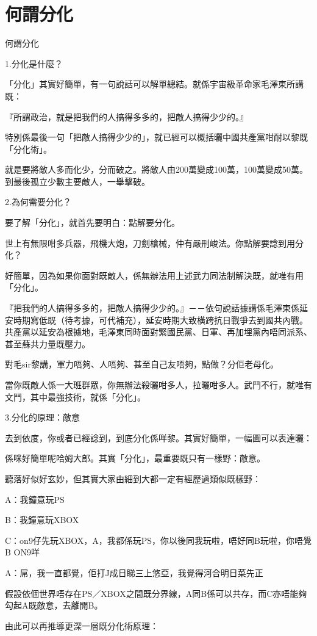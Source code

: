 \chapter{何謂分化}

何謂分化

1.分化是什麼？

「分化」其實好簡單，有一句說話可以解單總結。就係宇宙級革命家毛澤東所講既：

『所謂政治，就是把我們的人搞得多多的，把敵人搞得少少的。』

特別係最後一句「把敵人搞得少少的」，就已經可以概括曬中國共產黨咁耐以黎既「分化術」。

就是要將敵人多而化少，分而破之。將敵人由200萬變成100萬，100萬變成50萬。到最後孤立少數主要敵人，一舉擊破。

2.為何需要分化？

要了解「分化」，就首先要明白：點解要分化。

世上有無限咁多兵器，飛機大炮，刀劍槍械，仲有嚴刑峻法。你點解要諗到用分化？

好簡單，因為如果你面對既敵人，係無辦法用上述武力同法制解決既，就唯有用「分化」。

『把我們的人搞得多多的，把敵人搞得少少的。』－－依句說話據講係毛澤東係延安時期寫低既（待考據，可代補充），延安時期大致橫跨抗日戰爭去到國共內戰。共產黨以延安為根據地，毛澤東同時面對緊國民黨、日軍、再加埋黨內唔同派系、甚至蘇共力量既壓力。

對毛sir黎講，軍力唔夠、人唔夠、甚至自己友唔夠，點做？分佢老母化。

當你既敵人係一大班群眾，你無辦法殺曬咁多人，拉曬咁多人。武鬥不行，就唯有文鬥，其中最強技術，就係「分化」。

3.分化的原理：敵意

去到依度，你或者已經諗到，到底分化係咩黎。其實好簡單，一幅圖可以表達曬：

係咪好簡單呢哈姆大郎。其實「分化」，最重要既只有一樣野：敵意。

聽落好似好玄妙，但其實大家由細到大都一定有經歷過類似既樣野：

A：我鐘意玩PS

B：我鐘意玩XBOX

C：on9仔先玩XBOX，A，我都係玩PS，你以後同我玩啦，唔好同B玩啦，你唔覺B ON9咩

A：屌，我一直都覺，佢打J成日睇三上悠亞，我覺得河合明日菜先正

假設依個世界唔存在PS／XBOX之間既分界線，A同B係可以共存，而C亦唔能夠勾起A既敵意，去離開B。

由此可以再推導更深一層既分化術原理：

